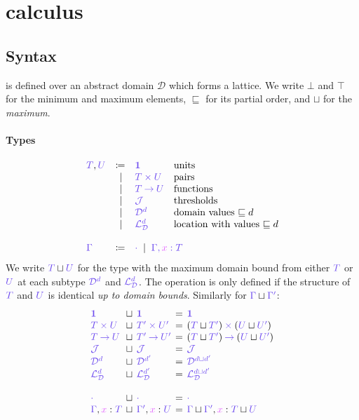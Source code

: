 \documentclass[main.tex]{subfiles}
\begin{document}
\section{\typedlambdalvar calculus}

\subsection{Syntax}%
\typedlambdalvar is defined over an abstract domain $\mathcal{D}$ which forms a lattice. We write $\bot$ and $\top$ for the minimum and maximum elements, $\sqsubseteq$ for its partial order, and $\sqcup$ for the \emph{maximum}.

\paragraph*{Types}
\[
\begin{array}{lrll}
  \ty{T}, \ty{U}
  & \coloneqq & \ty{\tyunit}        & \text{units} \\
  & \sep      & \ty{\typrod{T}{U}}  & \text{pairs} \\
  & \sep      & \ty{\tyfun{T}{U}}   & \text{functions}\\
  & \sep      & \ty{\tyJ}           & \text{thresholds} \\
  & \sep      & \ty{\tyD{d}}        & \text{domain values }{\sqsubseteq d}\\
  & \sep      & \ty{\tyL{d}}        & \text{location with values }{\sqsubseteq d}
  \\
  \\
  \ty{\Gamma}
  & \coloneqq & \multicolumn{2}{l}{\ty{\emptyenv} \sep \ty{\ty{\Gamma},\tmty{x}{T}}}
\end{array}
\]
We write $\ty{T}\sqcup\ty{U}$ for the type with the maximum domain bound from either $\ty{T}$ or $\ty{U}$ at each subtype $\tyD{d}$ and $\tyL{d}$. The operation is only defined if the structure of $\ty{T}$ and $\ty{U}$ is identical \emph{up to domain bounds}. Similarly for $\ty{\Gamma}\sqcup\ty{\Gamma'}$:
\[
  \setlength{\arraycolsep}{2pt}
  \begin{array}{lclcl}
    \ty{\tyunit} & \sqcup & \ty{\tyunit}
    & = & \ty{\tyunit}
    \\
    \ty{\typrod{T}{U}} & \sqcup & \ty{\typrod{T'}{U'}}
    & = & \typrod{(\ty{T}\sqcup\ty{T'})}{(\ty{U}\sqcup\ty{U'})}
    \\
    \ty{\tyfun{T}{U}} & \sqcup & \ty{\tyfun{T'}{U'}}
    & = & \tyfun{(\ty{T}\sqcup\ty{T'})}{(\ty{U}\sqcup\ty{U'})}
    \\
    \tyJ & \sqcup & \tyJ
    & = & \tyJ
    \\
    \tyD{d} & \sqcup & \tyD{d'}
    & = & \tyD{{d}\sqcup{d'}}
    \\
    \tyL{d} & \sqcup & \tyL{d'}
    & = & \tyL{{d}\sqcup{d'}}
    \\
    \\
    \ty{\emptyenv} & \sqcup & \ty{\emptyenv}
    & = & \ty{\emptyenv}
    \\
    \ty{\Gamma},\tmty{x}{T} & \sqcup & \ty{\Gamma'},\tmty{x}{U}
    & = & \ty{\Gamma}\sqcup\ty{\Gamma'},\tm{x}:{\ty{T}\sqcup\ty{U}}
  \end{array}
\]
\end{document}
